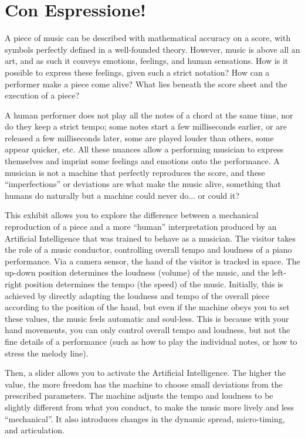 \section{Con Espressione!}
A piece of music can be described with mathematical accuracy on a score, with symbols perfectly defined in a well-founded theory. However, music is above all an art, and as such it conveys emotions, feelings, and human sensations. How is it possible to express these feelings, given such a strict notation? How can a performer make a piece come alive? What lies beneath the score sheet and the execution of a piece?

A human performer does not play all the notes of a chord at the same time, nor do they keep a strict tempo; some notes start a few milliseconds earlier, or are released a few milliseconds later, some are played louder than others, some appear quicker, etc. All these nuances allow a performing musician to express themselves and imprint some feelings and emotions onto the performance. A musician is not a machine that perfectly reproduces the score, and these ``imperfections'' or deviations are what make the music alive, something that humans do naturally but a machine could never do... or could it?

This exhibit allows you to explore the difference between a mechanical reproduction of a piece and a more ``human'' interpretation produced by an Artificial Intelligence that was trained to behave as a musician. The visitor takes the role of a music conductor, controlling overall tempo and loudness of a piano performance. Via a camera sensor, the hand of the visitor is tracked in space. The up-down position determines the loudness (volume) of the music, and the left-right position determines the tempo (the speed) of the music. Initially, this is achieved by directly adapting the loudness and tempo of the overall piece according to the position of the hand, but even if the machine obeys you to set these values, the music feels automatic and soul-less. This is because with your hand movements, you can only control overall tempo and loudness, but not the fine details of a performance (such as how to play the individual notes, or how to stress the melody line).

Then, a slider allows you to activate the Artificial Intelligence. The higher the value, the more freedom has the machine to choose small deviations from the prescribed parameters. The machine adjusts the tempo and loudness to be slightly different from what you conduct, to make the music more lively and less ``mechanical''. It also introduces changes in the dynamic spread, micro-timing, and articulation.


